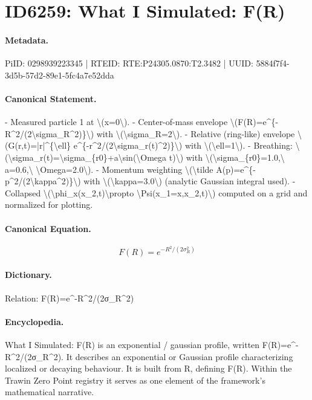 \section*{ID6259: What I Simulated: F(R)}
\paragraph{Metadata.}
PiID: 0298939223345 | RTEID: RTE:P24305.0870:T2.3482 | UUID: 5884f7f4-3d5b-57d2-89e1-5fc4a7e52dda

\paragraph{Canonical Statement.}
- Measured particle 1 at \textbackslash{}(x=0\textbackslash{}). - Center-of-mass envelope \textbackslash{}(F(R)=e\textasciicircum{}\{-R\textasciicircum{}2/(2\textbackslash{}sigma\_R\textasciicircum{}2)\}\textbackslash{}) with \textbackslash{}(\textbackslash{}sigma\_R=2\textbackslash{}). - Relative (ring-like) envelope \textbackslash{}(G(r,t)=|r|\textasciicircum{}\{\textbackslash{}ell\} e\textasciicircum{}\{-r\textasciicircum{}2/(2\textbackslash{}sigma\_r(t)\textasciicircum{}2)\}\textbackslash{}) with \textbackslash{}(\textbackslash{}ell=1\textbackslash{}). - Breathing: \textbackslash{}(\textbackslash{}sigma\_r(t)=\textbackslash{}sigma\_\{r0\}+a\textbackslash{}sin(\textbackslash{}Omega t)\textbackslash{}) with \textbackslash{}(\textbackslash{}sigma\_\{r0\}=1.0,\textbackslash{} a=0.6,\textbackslash{} \textbackslash{}Omega=2.0\textbackslash{}). - Momentum weighting \textbackslash{}(\textbackslash{}tilde A(p)=e\textasciicircum{}\{-p\textasciicircum{}2/(2\textbackslash{}kappa\textasciicircum{}2)\}\textbackslash{}) with \textbackslash{}(\textbackslash{}kappa=3.0\textbackslash{}) (analytic Gaussian integral used). - Collapsed \textbackslash{}(\textbackslash{}phi\_x(x\_2,t)\textbackslash{}propto \textbackslash{}Psi(x\_1=x,x\_2,t)\textbackslash{}) computed on a grid and normalized for plotting.

\paragraph{Canonical Equation.}
\[
F(R)=e^{-R^2/(2\sigma_R^2)}
\]

\paragraph{Dictionary.}
Relation: F(R)=e\textasciicircum{}-R\textasciicircum{}2/(2σ\_R\textasciicircum{}2)

\paragraph{Encyclopedia.}
What I Simulated: F(R) is an exponential / gaussian profile, written F(R)=e\textasciicircum{}-R\textasciicircum{}2/(2σ\_R\textasciicircum{}2). It describes an exponential or Gaussian profile characterizing localized or decaying behaviour. It is built from R, defining F(R). Within the Trawin Zero Point registry it serves as one element of the framework's mathematical narrative.
